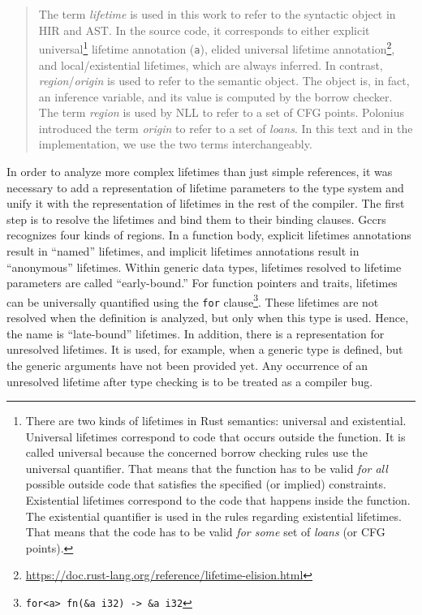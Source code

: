 \documentclass[
  11pt,
  twoside,symmetric]{report}
\DeclareRobustCommand{\href}[2]{#2\footnote{\url{#1}}}
\begin{document}
\begin{quote}
The term \emph{lifetime} is used in this work to refer to the syntactic
object in HIR and AST. In the source code, it corresponds to either
explicit universal\footnote{There are two kinds of lifetimes in Rust
  semantics: universal and existential. Universal lifetimes correspond
  to code that occurs outside the function. It is called universal
  because the concerned borrow checking rules use the universal
  quantifier. That means that the function has to be valid \emph{for
  all} possible outside code that satisfies the specified (or implied)
  constraints. Existential lifetimes correspond to the code that happens
  inside the function. The existential quantifier is used in the rules
  regarding existential lifetimes. That means that the code has to be
  valid \emph{for some} set of \emph{loans} (or CFG points).} lifetime
annotation (\texttt{\textquotesingle{}a}), elided universal lifetime
annotation\href{https://doc.rust-lang.org/reference/lifetime-elision.html}{\citeproc{ref-reference}{{[}7{]}}},
and local/existential lifetimes, which are always inferred. In contrast,
\emph{region}/\emph{origin} is used to refer to the semantic object. The
object is, in fact, an inference variable, and its value is computed by
the borrow checker. The term \emph{region} is used by NLL to refer to a
set of CFG points. Polonius introduced the term \emph{origin} to refer
to a set of \emph{loans}. In this text and in the implementation, we use
the two terms interchangeably.
\end{quote}

In order to analyze more complex lifetimes than just simple references,
it was necessary to add a representation of lifetime parameters to the
type system and unify it with the representation of lifetimes in the
rest of the compiler. The first step is to resolve the lifetimes and
bind them to their binding clauses. Gccrs recognizes four kinds of
regions. In a function body, explicit lifetimes annotations result in
``named'' lifetimes, and implicit lifetimes annotations result in
``anonymous'' lifetimes. Within generic data types, lifetimes resolved
to lifetime parameters are called ``early-bound.'' For function pointers
and traits, lifetimes can be universally quantified using the
\texttt{for} clause\footnote{\texttt{for\textless{}\textquotesingle{}a\textgreater{}\ fn(\&\textquotesingle{}a\ i32)\ -\textgreater{}\ \&\textquotesingle{}a\ i32}}.
These lifetimes are not resolved when the definition is analyzed, but
only when this type is used. Hence, the name is ``late-bound''
lifetimes. In addition, there is a representation for unresolved
lifetimes. It is used, for example, when a generic type is defined, but
the generic arguments have not been provided yet. Any occurrence of an
unresolved lifetime after type checking is to be treated as a compiler
bug.
\end{document}
